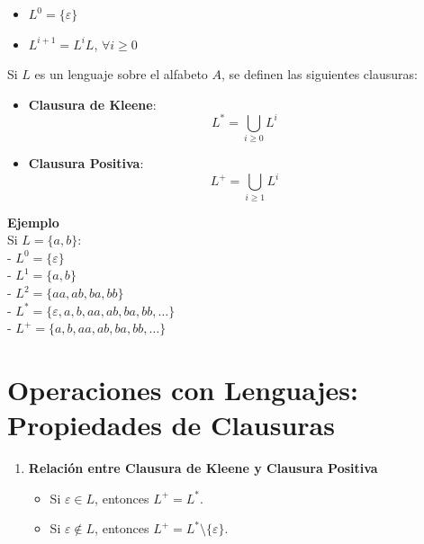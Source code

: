 \documentclass[12pt]{report} %
\providecommand{\tightlist}{%
  \setlength{\itemsep}{0pt}\setlength{\parskip}{0pt}}
\begin{document}
\begin{itemize}
\tightlist
\item
  \(L^0 = \{\varepsilon\}\)\\
\item
  \(L^{i+1} = L^iL\), \(\forall i \geq 0\)
\end{itemize}

Si \(L\) es un lenguaje sobre el alfabeto \(A\), se definen las
siguientes clausuras:

\begin{itemize}
\item
  \textbf{Clausura de Kleene}:\\
  \[
    L^* = \bigcup_{i \geq 0} L^i
    \]
\item
  \textbf{Clausura Positiva}:\\
  \[
    L^+ = \bigcup_{i \geq 1} L^i
    \]
\end{itemize}

\textbf{Ejemplo}\\
Si \(L = \{a, b\}\):\\
- \(L^0 = \{\varepsilon\}\)\\
- \(L^1 = \{a, b\}\)\\
- \(L^2 = \{aa, ab, ba, bb\}\)\\
- \(L^* = \{\varepsilon, a, b, aa, ab, ba, bb, \ldots\}\)\\
- \(L^+ = \{a, b, aa, ab, ba, bb, \ldots\}\)

\hypertarget{operaciones-con-lenguajes-propiedades-de-clausuras}{%
\section{Operaciones con Lenguajes: Propiedades de
Clausuras}\label{operaciones-con-lenguajes-propiedades-de-clausuras}}

\begin{enumerate}
\def\labelenumi{\arabic{enumi}.}
\tightlist
\item
  \textbf{Relación entre Clausura de Kleene y Clausura Positiva}

  \begin{itemize}
  \tightlist
  \item
    Si \(\varepsilon \in L\), entonces \(L^+ = L^*\).\\
  \item
    Si \(\varepsilon \notin L\), entonces
    \(L^+ = L^* \setminus \{\varepsilon\}\).
  \end{itemize}
\end{enumerate}
\end{document}
